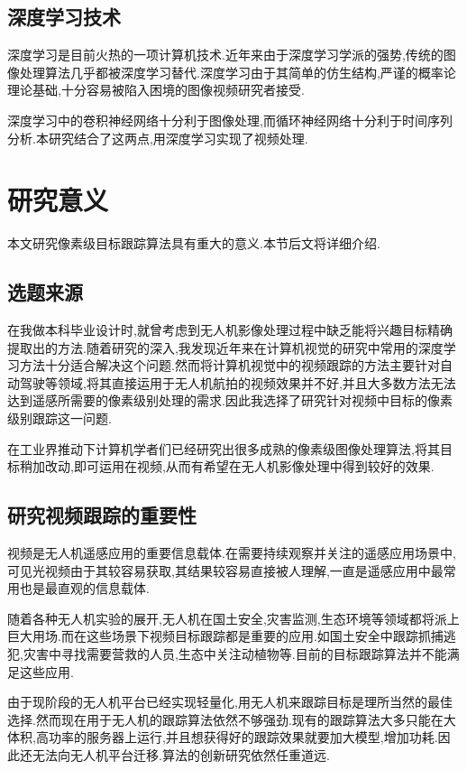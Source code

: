 \subsection{深度学习技术}
深度学习是目前火热的一项计算机技术.近年来由于深度学习学派的强势,传统的图像处理算法几乎都被深度学习替代.深度学习由于其简单的仿生结构,严谨的概率论理论基础,十分容易被陷入困境的图像视频研究者接受.
\par
深度学习中的卷积神经网络十分利于图像处理,而循环神经网络十分利于时间序列分析.本研究结合了这两点,用深度学习实现了视频处理.

\newpage
\section{研究意义}
本文研究像素级目标跟踪算法具有重大的意义.本节后文将详细介绍.
\subsection{选题来源}
在我做本科毕业设计\supercite{benchme}时,就曾考虑到无人机影像处理过程中缺乏能将兴趣目标精确提取出的方法.随着研究的深入,我发现近年来在计算机视觉的研究中常用的深度学习方法十分适合解决这个问题.然而将计算机视觉中的视频跟踪的方法主要针对自动驾驶等领域,将其直接运用于无人机航拍的视频效果并不好,并且大多数方法无法达到遥感所需要的像素级别处理的需求.因此我选择了研究针对视频中目标的像素级别跟踪这一问题.
\par
在工业界推动下计算机学者们已经研究出很多成熟的像素级图像处理算法,将其目标稍加改动,即可运用在视频,从而有希望在无人机影像处理中得到较好的效果.

\subsection{研究视频跟踪的重要性}
视频是无人机遥感应用的重要信息载体.在需要持续观察并关注的遥感应用场景中,可见光视频由于其较容易获取,其结果较容易直接被人理解,一直是遥感应用中最常用也是最直观的信息载体.
\par
随着各种无人机实验的展开,无人机在国土安全,灾害监测,生态环境等领域都将派上巨大用场.而在这些场景下视频目标跟踪都是重要的应用.如国土安全中跟踪抓捕逃犯,灾害中寻找需要营救的人员,生态中关注动植物等.目前的目标跟踪算法并不能满足这些应用.
\par
由于现阶段的无人机平台已经实现轻量化,用无人机来跟踪目标是理所当然的最佳选择.然而现在用于无人机的跟踪算法依然不够强劲.现有的跟踪算法大多只能在大体积,高功率的服务器上运行,并且想获得好的跟踪效果就要加大模型,增加功耗.因此还无法向无人机平台迁移.算法的创新研究依然任重道远.

